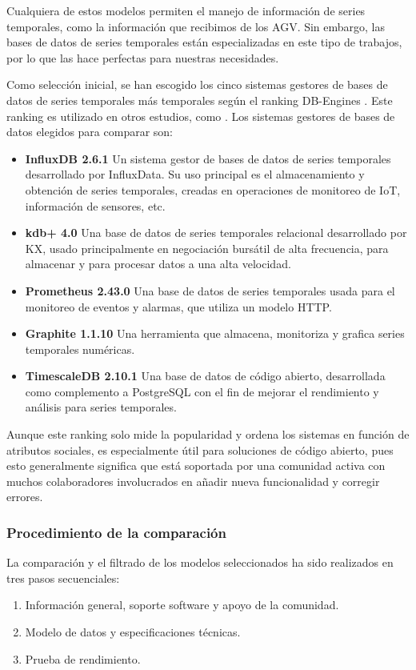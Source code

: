 Cualquiera de estos modelos permiten el manejo de información de series temporales, como la información que recibimos
de los AGV. Sin embargo, las bases de datos de series temporales están especializadas en este tipo de trabajos, por lo que
las hace perfectas para nuestras necesidades.

Como selección inicial, se han escogido los cinco sistemas gestores de bases de datos de series temporales más temporales
según el ranking DB-Engines \cite{dbengines:rankingTSDBMS}. Este ranking es utilizado en otros estudios, como \cite{10.1007/978-3-030-50426-7_28}.
Los sistemas gestores de bases de datos elegidos para comparar son:

\begin{itemize}
    \item \textbf{InfluxDB 2.6.1} Un sistema gestor de bases de datos de series temporales desarrollado por InfluxData. Su
        uso principal es el almacenamiento y obtención de series temporales, creadas en operaciones de monitoreo de IoT,
        información de sensores, etc.
    \item \textbf{kdb+ 4.0} Una base de datos de series temporales relacional desarrollado por KX, usado principalmente en
        negociación bursátil de alta frecuencia, para almacenar y para procesar datos a una alta velocidad.
    \item \textbf{Prometheus 2.43.0} Una base de datos de series temporales usada para el monitoreo de eventos y alarmas, que
        utiliza un modelo HTTP.
    \item \textbf{Graphite 1.1.10} Una herramienta que almacena, monitoriza y grafica series temporales numéricas.   
    \item \textbf{TimescaleDB 2.10.1} Una base de datos de código abierto, desarrollada como complemento a PostgreSQL con el
        fin de mejorar el rendimiento y análisis para series temporales.
\end{itemize}

Aunque este ranking solo mide la popularidad y ordena los sistemas en función de atributos sociales, es especialmente
útil para soluciones de código abierto, pues esto generalmente significa que está soportada por una comunidad activa
con muchos colaboradores involucrados en añadir nueva funcionalidad y corregir errores.

\subsubsection*{Procedimiento de la comparación}
La comparación y el filtrado de los modelos seleccionados ha sido realizados en tres pasos secuenciales:
\begin{enumerate}
    \item Información general, soporte software y apoyo de la comunidad.
    \item Modelo de datos y especificaciones técnicas.
    \item Prueba de rendimiento.
\end{enumerate}

